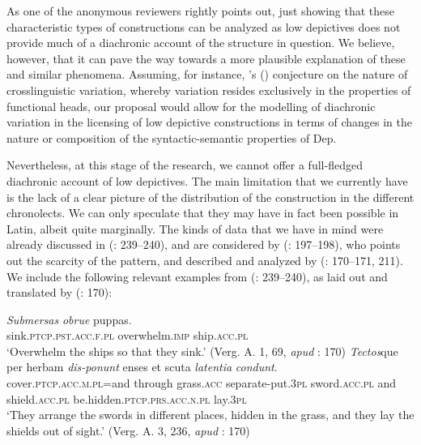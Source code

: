 \documentclass[output=paper,colorlinks,citecolor=brown,
]{langscibook}
\begin{document}
As one of the anonymous reviewers rightly points out, just showing that these characteristic types of constructions can be analyzed as low depictives does not provide much of a diachronic account of the structure in question. We believe, however, that it can pave the way towards a more plausible explanation of these and similar phenomena. Assuming, for instance,  \citeauthor{Borer1984}'s (\citeyear{Borer1984}) conjecture on the nature of crosslinguistic variation, whereby variation resides exclusively in the properties of functional heads, our proposal would allow for the modelling of diachronic variation in the licensing of low depictive constructions in terms of changes in the nature or composition of the syntactic-semantic properties of Dep. 

Nevertheless, at this stage of the research, we cannot offer a full-fledged diachronic account of low depictives. The main limitation that we   currently have is the lack of a clear picture of the distribution of the construction  in the different chronolects. We can only speculate that they may have in fact been possible in Latin, albeit quite marginally. The kinds of data that we have in mind were already discussed in \citeauthor{Kühner1912} (\citeyear{Kühner1912}: 239–240), and are considered by \citeauthor{Pinkster1995} (\citeyear{Pinkster1995}: 197–198), who points out the scarcity of the pattern, and described and analyzed by \citeauthor{Acedo-Matellan2016} (\citeyear{Acedo-Matellan2016}: 170–171, 211). We include the following relevant examples from \citeauthor{Kühner1912} (\citeyear{Kühner1912}: 239–240), as laid out and translated by \citeauthor{Acedo-Matellan2016} (\citeyear{Acedo-Matellan2016}: 170):

\ea
  \ea \label{ex:acedomatellan:submersas}
    \gll \textit{Submersas} \textit{obrue} puppas.\\
sink.\textsc{ptcp.pst.acc.f.pl} overwhelm.\textsc{imp} ship.\textsc{acc.pl}\\
    \glt `Overwhelm the ships so that they sink.’ (Verg. A. 1, 69, \emph{apud} \citealt{Acedo-Matellan2016}: 170)
  \ex
    \gll \textit{Tectos}que per herbam \textit{dis-ponunt} enses et scuta \textit{latentia} \textit{condunt}.\\
cover.\textsc{ptcp.acc.m.pl}=and through grass.\textsc{acc} separate-put.3\textsc{pl} sword.\textsc{acc.pl} and shield.\textsc{acc.pl} be.hidden.\textsc{ptcp.prs.acc.n.pl} lay.\textsc{3pl}\\
    \glt `They arrange the swords in different places, hidden in the grass, and they lay the shields out of sight.’ 
(Verg. A. 3, 236, \emph{apud} \citealt{Acedo-Matellan2016}: 170)
  \z 
\z 
\end{document}
